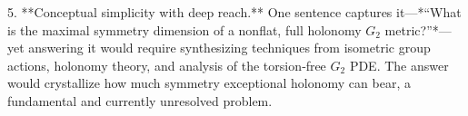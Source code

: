 5. **Conceptual simplicity with deep reach.**  
   One sentence captures it—*“What is the maximal symmetry dimension of a nonflat, full holonomy \(G_2\) metric?”*—yet answering it would require synthesizing techniques from isometric group actions, holonomy theory, and analysis of the torsion‑free \(G_2\) PDE. The answer would crystallize how much symmetry exceptional holonomy can bear, a fundamental and currently unresolved problem.